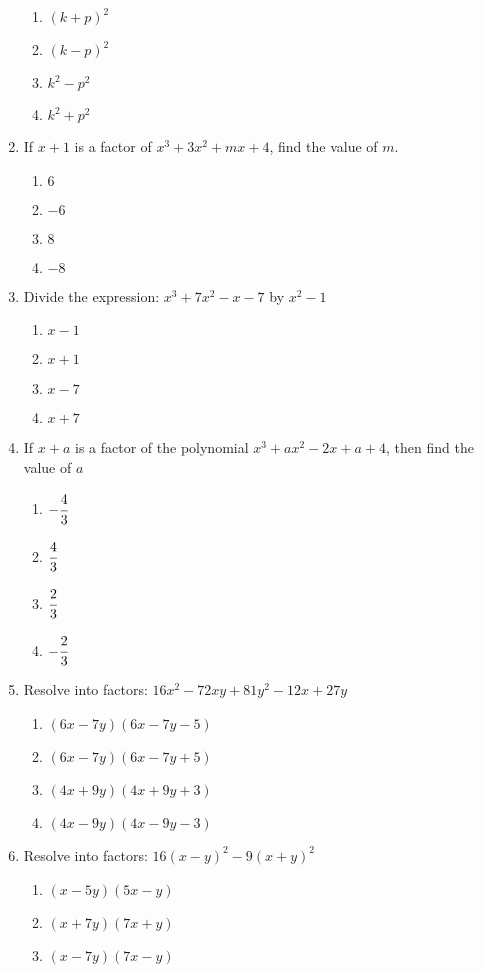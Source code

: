 \begin{multicols}{2}
\begin{enumerate}[label={\arabic*.}]
\begin{enumerate}[label={\Alph*.}]
	\item \((k+p)^2\)
	\item \((k-p)^2\)
	\item \(k^2 - p^2\)
	\item \(k^2 + p^2\)
	\end{enumerate}
\item If $x+1$ is a factor of $x^3 + 3x^2 + mx + 4$, find the value of $m$. 
	\begin{enumerate}[label={\Alph*.}]
	\item \(6\)
	\item \(-6\)
	\item \(8\)
	\item \(-8\)
	\end{enumerate}
\item Divide the expression: $x^3 + 7x^2 -x - 7$ by $x^2-1$
	\begin{enumerate}[label={\Alph*.}]
	\item \(x-1\)
	\item \(x+1\)
	\item \(x-7\)
	\item \(x+7\)
	\end{enumerate}
\item If $x+a$ is a factor of the polynomial $x^3 +ax^2 -2x +a + 4$, then find the value of $a$
	\begin{enumerate}[label={\Alph*.}]
	\item \(-\cfrac{4}{3}\)
	\item \(\cfrac{4}{3}\)
	\item \(\cfrac{2}{3}\)
	\item \(-\cfrac{2}{3}\)
	\end{enumerate}
\item Resolve into factors: $16x^2 - 72xy + 81y^2 - 12x + 27y$
	\begin{enumerate}[label={\Alph*.}]
	\item \((6x -7y)(6x - 7y -5)\)
	\item \((6x -7y)(6x - 7y +5)\)
	\item \((4x + 9y)(4x + 9y + 3)\)
	\item \((4x - 9y)(4x - 9y - 3)\)
	\end{enumerate}
\item Resolve into factors: $16(x-y)^2 - 9(x+y)^2$
	\begin{enumerate}[label={\Alph*.}]
	\item \((x-5y)(5x -y)\)
	\item \((x+7y)(7x + y)\)
	\item \((x-7y)(7x-y)\)

\end{enumerate}
\end{enumerate}
\end{multicols}

